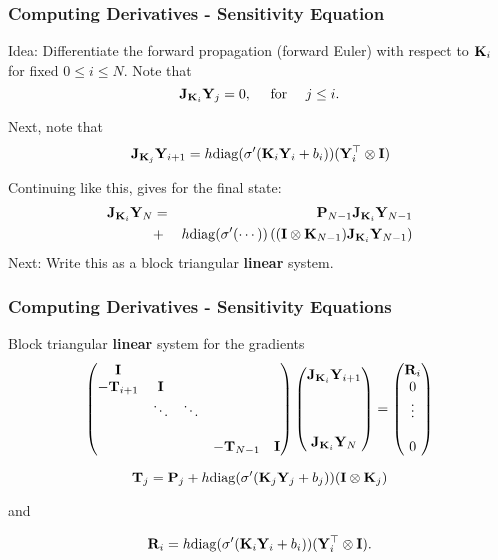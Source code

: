 \documentclass[12pt,fleqn, beamer]{beamer}
\begin{document}
\begin{frame}\frametitle{Computing Derivatives - Sensitivity Equation}
Idea: Differentiate the forward propagation (forward Euler) with respect to ${\bf K}_i$ for fixed  $0\leq i \leq N$. Note that
$$
	{\bf J}_{{\bf K}_i} {\bf Y}_j = 0, \quad \text{ for } \quad j\leq i. 
$$

\smallskip
\pause

Next, note that 
$$
{\bf J}_{{\bf K}_j} {\bf Y}_{i+1} = h {\rm diag}(\sigma'( {\bf K}_i {\bf Y}_i + b_i))
(  {\bf Y}_i^\top \otimes {\bf I})
$$

\smallskip
\pause

Continuing like this, gives for the final state:
\begin{eqnarray*}
{\bf J}_{{\bf K}_i}{\bf Y}_{N} & =& {\bf P}_{N-1}  {\bf J}_{{\bf K}_i}{\bf Y}_{N-1}  \\
	&  +& h {\rm diag}(\sigma'( \cdots)) \left( ( {\bf I} \otimes {\bf K}_{N-1}) {\bf J}_{{\bf K}_i}{\bf Y}_{N-1}\right) 
\end{eqnarray*}
\smallskip
\pause
Next: Write this as a block triangular {\bf linear} system.
\end{frame}


\begin{frame}\frametitle{Computing Derivatives - Sensitivity Equations}

Block triangular {\bf linear} system for the gradients
{\small
\begin{eqnarray*}
\begin{pmatrix}
{\bf I}              &                &                &          &       \\
-{\bf T}_{i+1}    &   {\bf I}       &                &          &       \\
                    & \ddots    &  \ddots    &          &      \\
                    &     &      &          &      \\
                    &     &        &   -{\bf T}_{N-1}       & {\bf I}
                    \end{pmatrix}
                    \begin{pmatrix}
                    {\bf J}_{{\bf K}_i}{\bf Y}_{i+1} \\    \\   \\ \\   {\bf J}_{{\bf K}_i}{\bf Y}_{N}
                    \end{pmatrix} =
                    \begin{pmatrix}
                    {\bf R}_i \\  0\\  \vdots \\ \\   0
                    \end{pmatrix}
\end{eqnarray*}}


$${\bf T}_j = {\bf P}_j + h {\rm diag}(\sigma'( {\bf K}_j {\bf Y}_j+ b_j))
({\bf I} \otimes {\bf K}_j) $$

and 

$$ {\bf R}_i = h {\rm diag}(\sigma'({\bf K}_i {\bf Y}_i  + b_i)) ( {\bf Y}_i^\top \otimes {\bf I}). $$


\end{frame}
\end{document}
